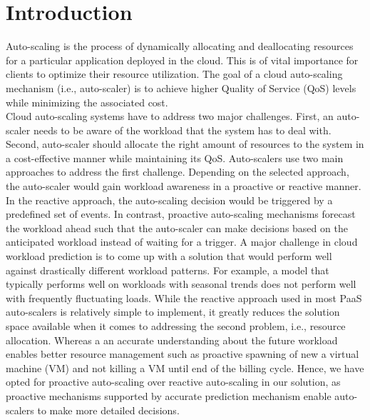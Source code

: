 \section{Introduction}
Auto-scaling is the process of dynamically allocating and deallocating resources for a particular application deployed in the cloud. This is of vital importance for clients to optimize their resource utilization. The goal of a cloud auto-scaling mechanism (i.e., auto-scaler) is to achieve higher Quality of Service (QoS) levels while minimizing the associated cost.\\

Cloud auto-scaling systems have to address two major challenges. First, an auto-scaler needs to be aware of the workload that the system has to deal with. Second, auto-scaler should allocate the right amount of resources to the system in a cost-effective manner while maintaining its QoS. Auto-scalers use two main approaches to address the first challenge. Depending on the selected approach, the auto-scaler would gain workload awareness in a proactive or reactive manner. In the reactive approach, the auto-scaling decision would be triggered by a predefined set of events. In contrast, proactive auto-scaling mechanisms forecast the workload ahead such that the auto-scaler can make decisions based on the anticipated workload instead of waiting for a trigger. A major challenge in cloud workload prediction is to come up with a solution that would perform well against drastically different workload patterns. For example, a model that typically performs well on workloads with seasonal trends does not perform well with frequently fluctuating loads. While the reactive approach used in most PaaS auto-scalers is relatively simple to implement, it greatly reduces the solution space available when it comes to addressing the second problem, i.e., resource allocation. Whereas a an accurate understanding about the future workload enables better resource management such as proactive spawning of new a virtual machine (VM) and not killing a VM until end of the billing cycle. Hence, we have opted for proactive auto-scaling over reactive auto-scaling in our solution, as proactive mechanisms supported by accurate prediction mechanism enable auto-scalers to make more detailed decisions. \\

